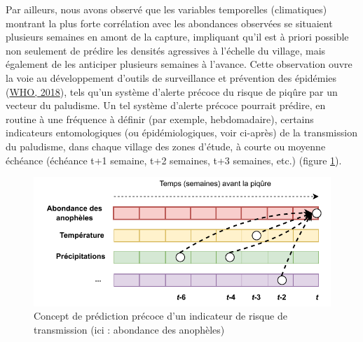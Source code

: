 \documentclass[12pt,twoside]{reedthesis}
\begin{document}
Par ailleurs, nous avons observé que les variables temporelles (climatiques) montrant la plus forte corrélation avec les abondances observées se situaient plusieurs semaines en amont de la capture, impliquant qu'il est à priori possible non seulement de prédire les densités agressives à l'échelle du village, mais également de les anticiper plusieurs semaines à l'avance. Cette observation ouvre la voie au développement d'outils de surveillance et prévention des épidémies (\protect\hyperlink{ref-who_malaria_surveillance}{WHO, 2018}), tels qu'un système d'alerte précoce du risque de piqûre par un vecteur du paludisme. Un tel système d'alerte précoce pourrait prédire, en routine à une fréquence à définir (par exemple, hebdomadaire), certains indicateurs entomologiques (ou épidémiologiques, voir ci-après) de la transmission du paludisme, dans chaque village des zones d'étude, à courte ou moyenne échéance (échéance t+1 semaine, t+2 semaines, t+3 semaines, etc.) (figure \ref{fig:early-warning-system}).\\
\begin{figure}

{\centering \includegraphics[width=0.8\linewidth]{figure/concept_early_warning_system} 

}

\caption[Concept de prédiction précoce d’un indicateur de risque de transmission]{Concept de prédiction précoce d’un indicateur de risque de transmission (ici : abondance des anophèles)}\label{fig:early-warning-system}
\end{figure}
\end{document}
